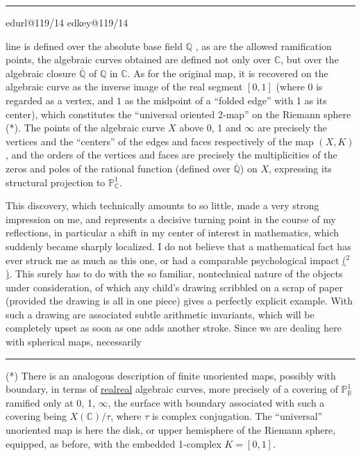 \documentclass[11pt,a4paper]{article}
\makeatletter
\newif\ifreading
\def\CurrentScanURL{}
\def\CurrentPageKey{}
\def\CurrentApparatus{}
\newcommand{\scanpage}[1]{%
  \clearpage
  \expandafter\let\expandafter\CurrentScanURL\csname edurl@#1\endcsname
  \expandafter\let\expandafter\CurrentPageKey\csname edkey@#1\endcsname
  \def\CurrentApparatus{}%
  \hypertarget{scan-\CurrentPageKey}{}%
  \typeout{EDITION-SCAN: \CurrentPageKey; PDFPAGE: \the\numexpr\ReadonlyShipoutCounter+1\relax}%
  \ifreading
    \marginnote{\raggedright\scriptsize\sffamily\href{\CurrentScanURL}{119 / \csname edpage@#1\endcsname}}%
  \else
    \noindent{\small\sffamily\href{\CurrentScanURL}{[scan #1]}}\par\smallskip
  \fi}
\newcommand{\mspage}[1]{%
  \ifreading\marginnote{\raggedright\scriptsize\sffamily p.\,#1}[2\baselineskip]%
  \else\noindent{\small\sffamily[p.\,#1]}\par\smallskip\fi}
\let\TextUline\uline
\renewcommand{\uline}[1]{\ifmmode\underline{#1}\else\TextUline{#1}\fi}
\newcommand{\finishscan}{\ifx\CurrentApparatus\empty\else\par\bigskip\noindent\rule{.35\linewidth}{.35pt}\par\smallskip{\footnotesize\setlength{\parskip}{3pt}\CurrentApparatus}\fi}
\newcommand{\notecall}[3]{\hypertarget{#2}{\hyperlink{note-#1}{#3}}}
\makeatother
\begin{document}
\finishscan
\scanpage{119/14}
\mspage{12}

line is defined over the absolute base field $\mathbb{Q}$ ,
as are the allowed ramification points, the algebraic curves
obtained are defined not only over $\mathbb{C}$, but over the algebraic
closure $\overline{\mathbb{Q}}$ of $\mathbb{Q}$ in $\mathbb{C}$. As for the original map, it
is recovered on the algebraic curve as the inverse image of the real
segment $[0,1]$ (where $0$ is regarded as a vertex, and $1$ as
the midpoint of a ``folded edge'' with 1 as its center), which constitutes
the ``universal oriented 2-map'' on the Riemann sphere (*).
The points of the algebraic curve $X$ above 0, 1 and $\infty$
are precisely the vertices and the ``centers'' of the edges and
faces respectively of the map $(X,K)$, and the orders of the vertices
and faces are precisely the multiplicities of the zeros and
poles of the rational function (defined over $\overline{\mathbb{Q}}$) on $X$,
expressing its structural projection to $\mathbb{P}^1_{\mathbb{C}}$.

This discovery, which technically amounts to so little,
made a very strong impression on me, and represents
a decisive turning point in the course of my reflections, in particular
a shift in my center of interest in mathematics, which
suddenly became sharply localized. I do not believe that a
mathematical fact has ever struck me as much as this one, or had
a comparable psychological impact \notecall{copy1-2}{call-esq_119_014-2-1}{($^2$)}. This surely has to do with the
so familiar, nontechnical nature of the objects under consideration,
of which any child's drawing scribbled on a scrap of paper (provided
the drawing is all in one piece) gives a perfectly
explicit example. With such a drawing are associated subtle arithmetic
invariants, which will be completely upset as soon as
one adds another stroke. Since we are dealing here with spherical maps, necessarily

\noindent\rule{4cm}{0.4pt}

(*) There is an analogous description of finite unoriented maps,
possibly with boundary, in terms of \uline{real} algebraic curves,
more precisely of a covering of $\mathbb{P}^1_{\mathbb{R}}$ ramified only at 0, 1, $\infty$,
the surface with boundary associated with such a covering being $X(\mathbb{C})/\tau$, where $\tau$
is complex conjugation. The ``universal'' unoriented map is
here the disk, or upper hemisphere of the Riemann sphere, equipped,
as before, with the embedded 1-complex $K = [0,1]$.
\end{document}
